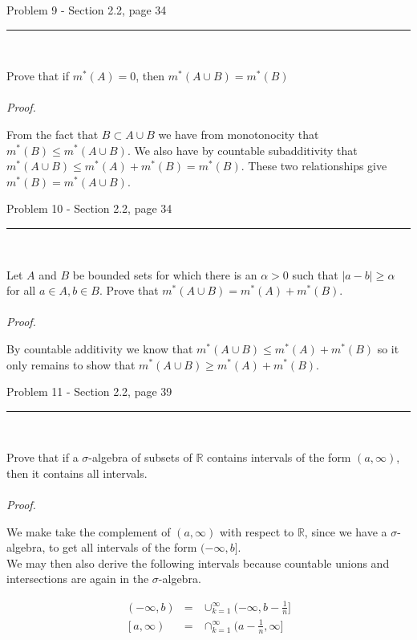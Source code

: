 \documentclass[11pt,reqno]{article}
\begin{document}
\begin{flushleft} 
Problem 9 - Section 2.2, page 34\\
\rule{500pt}{1pt}\\
\end{flushleft} 

Prove that if $m^*(A) = 0$, then $m^*(A \cup B) = m^*(B)$
\\\\ \emph{Proof.}

From the fact that $B \subset A \cup B$ we have from monotonocity that $m^*(B) \le m^*(A \cup B)$. We also have by countable subadditivity that $m^*(A \cup B) \le m^*(A) + m^*(B) = m^*(B)$. These two relationships give $m^*(B) = m^*(A \cup B)$.

\begin{flushleft} 
Problem 10 - Section 2.2, page 34\\
\rule{500pt}{1pt}\\
\end{flushleft} 

Let $A$ and $B$ be bounded sets for which there is an $\alpha > 0$ such that $|a - b| \ge \alpha$ for all $a \in A, b \in B$. Prove that $m^*(A \cup B) = m^*(A) + m ^*(B)$.
\\\\ \emph{Proof.}

By countable additivity we know that $m^*(A \cup B) \le m^*(A) + m^*(B)$ so it only remains to show that $m^*(A \cup B) \ge m^*(A) + m^*(B)$.

\begin{flushleft} 
Problem 11 - Section 2.2, page 39\\
\rule{500pt}{1pt}\\
\end{flushleft} 

Prove that if a $\sigma$-algebra of subsets of $\mathbb{R}$ contains intervals of the form $(a,\infty)$, then it contains all intervals.
\\\\ \emph{Proof.}

We make take the complement of $(a,\infty)$ with respect to $\mathbb{R}$, since we have a $\sigma$-algebra, to get all intervals of the form $(-\infty, b]$.\\
We may then also derive the following intervals because countable unions and intersections are again in the $\sigma$-algebra.

\begin{eqnarray*}
(-\infty, b) &=& \cup_{k = 1}^\infty (-\infty, b - \frac{1}{n}] \\
\left[a, \infty \right) &=& \cap_{k = 1}^\infty (a - \frac{1}{n}, \infty]
\end{eqnarray*}
\end{document}
